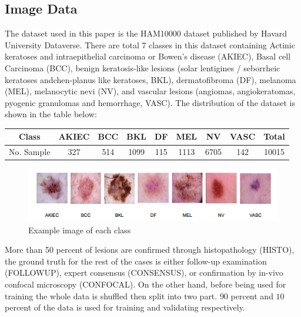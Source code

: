 \subsection{Image Data}
The dataset used in this paper is the HAM10000 dataset published by Havard University Dataverse\cite{10417}. There are total 7 classes in this dataset containing Actinic keratoses and intraepithelial carcinoma or Bowen's disease (AKIEC), Basal cell Carcinoma (BCC),  benign keratosis-like lesions (solar lentigines / seborrheic keratoses andchen-planus like keratoses, BKL), dermatofibroma (DF), melanoma (MEL), melanocytic nevi (NV), and vascular lesions (angiomas, angiokeratomas, pyogenic granulomas and hemorrhage, VASC). The distribution of the dataset is shown in the table below:
\begin{center}
	\begin{tabular}{|c c c c c c c c c|} 
		\hline
		Class & AKIEC & BCC & BKL & DF & MEL & NV & VASC & Total \\ 
		\hline
		No. Sample & 327 & 514 & 1099 & 115 & 1113 & 6705 & 142 & 10015 \\
		\hline
	\end{tabular}
\end{center}
\begin{figure}
	\centering
	\includegraphics[width=1\linewidth]{img/DataDistribution}
	\caption{Example image of each class}
	\label{fig:datadistribution}
\end{figure}
More than 50 percent of lesions are confirmed through histopathology (HISTO), the ground truth for the rest of the cases is either follow-up examination (FOLLOWUP), expert consensus (CONSENSUS), or confirmation by in-vivo confocal microscopy (CONFOCAL). On the other hand, before being used for training the whole data is shuffled then split into two part. $90$ percent and $10$ percent of the data is used for training and validating respectively.\\
